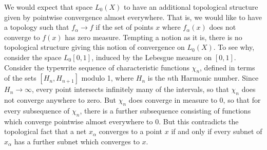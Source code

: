 \begin{example}
    We would expect that space $L_0(X)$ to have an additional topological structure given by pointwise convergence almost everywhere. That is, we would like to have a topology such that $f_\alpha \to f$ if the set of points $x$ where $f_\alpha(x)$ does not converge to $f(x)$ has zero measure. Tempting a notion as it is, there is no topological structure giving this notion of convergence on $L_0(X)$. To see why, consider the space $L_0[0,1]$, induced by the Lebesgue measure on $[0,1]$. Consider the typewrite sequence of characteristic functions $\chi_n$, defined in terms of the sets $[H_n, H_{n+1}]$ modulo 1, where $H_n$ is the $n$th Harmonic number. Since $H_n \to \infty$, every point intersects infinitely many of the intervals, so that $\chi_n$ does not converge anywhere to zero. But $\chi_n$ does converge in measure to 0, so that for every subsequence of $\chi_n$, there is a further subsequence consisting of functions which converge pointwise almost everywhere to 0. But this contradicts the topological fact that a net $x_\alpha$ converges to a point $x$ if and only if every subnet of $x_\alpha$ has a further subnet which converges to $x$.
\end{example}

